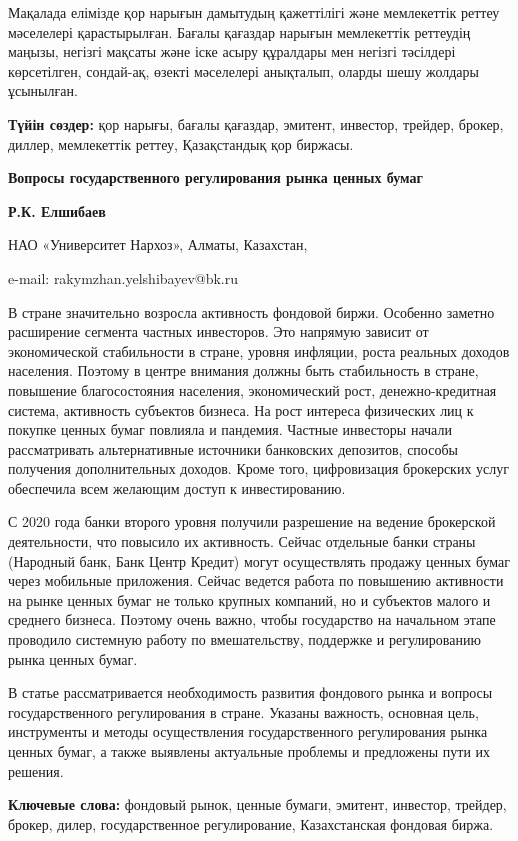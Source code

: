 Мақалада елімізде қор нарығын дамытудың қажеттілігі және мемлекеттік
реттеу мәселелері қарастырылған. Бағалы қағаздар нарығын мемлекеттік
реттеудің маңызы, негізгі мақсаты және іске асыру құралдары мен негізгі
тәсілдері көрсетілген, сондай-ақ, өзекті мәселелері анықталып, оларды
шешу жолдары ұсынылған.

{\bfseries Түйін сөздер:} қор нарығы, бағалы қағаздар, эмитент, инвестор,
трейдер, брокер, диллер, мемлекеттік реттеу, Қазақстандық қор биржасы.

{\bfseries Вопросы государственного регулирования рынка ценных бумаг}

{\bfseries Р.К. Елшибаев}

НАО «Университет Нархоз», Алматы, Казахстан,

e-mail: rakymzhan.yelshibayev@bk.ru

В стране значительно возросла активность фондовой биржи. Особенно
заметно расширение сегмента частных инвесторов. Это напрямую зависит от
экономической стабильности в стране, уровня инфляции, роста реальных
доходов населения. Поэтому в центре внимания должны быть стабильность в
стране, повышение благосостояния населения, экономический рост,
денежно-кредитная система, активность субъектов бизнеса. На рост
интереса физических лиц к покупке ценных бумаг повлияла и пандемия.
Частные инвесторы начали рассматривать альтернативные источники
банковских депозитов, способы получения дополнительных доходов. Кроме
того, цифровизация брокерских услуг обеспечила всем желающим доступ к
инвестированию.

С 2020 года банки второго уровня получили разрешение на ведение
брокерской деятельности, что повысило их активность. Сейчас отдельные
банки страны (Народный банк, Банк Центр Кредит) могут осуществлять
продажу ценных бумаг через мобильные приложения. Сейчас ведется работа
по повышению активности на рынке ценных бумаг не только крупных
компаний, но и субъектов малого и среднего бизнеса. Поэтому очень важно,
чтобы государство на начальном этапе проводило системную работу по
вмешательству, поддержке и регулированию рынка ценных бумаг.

В статье рассматривается необходимость развития фондового рынка и
вопросы государственного регулирования в стране. Указаны важность,
основная цель, инструменты и методы осуществления государственного
регулирования рынка ценных бумаг, а также выявлены актуальные проблемы и
предложены пути их решения.

{\bfseries Ключевые слова:} фондовый рынок, ценные бумаги, эмитент,
инвестор, трейдер, брокер, дилер, государственное регулирование,
Казахстанская фондовая биржа.

